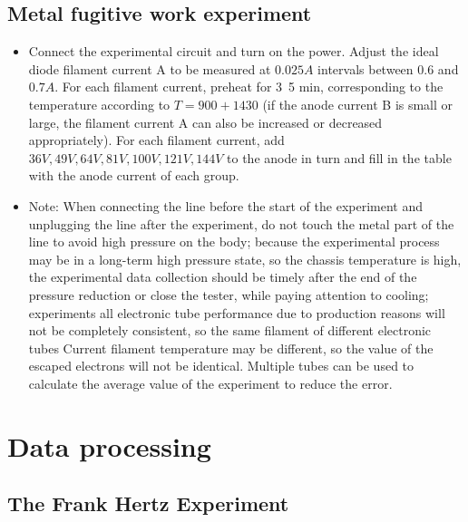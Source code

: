 \documentclass[UTF8]{article}
\begin{document}
    \subsection{Metal fugitive work experiment}
    \begin{itemize}
    \item Connect the experimental circuit and turn on the power. Adjust the ideal diode filament current A to be measured at $0.025A$ intervals between $0.6$ and $0.7A$. For each filament current, preheat for 3~5 min, corresponding to the temperature according to $T = 900+1430$ (if the anode current B is small or large, the filament current A can also be increased or decreased appropriately). For each filament current, add $36V,49V,64V,81V,100V,121V,144V$ to the anode in turn and fill in the table with the anode current of each group. 
    \item Note: When connecting the line before the start of the experiment and unplugging the line after the experiment, do not touch the metal part of the line to avoid high pressure on the body; because the experimental process may be in a long-term high pressure state, so the chassis temperature is high, the experimental data collection should be timely after the end of the pressure reduction or close the tester, while paying attention to cooling; experiments all electronic tube performance due to production reasons will not be completely consistent, so the same filament of different electronic tubes Current filament temperature may be different, so the value of the escaped electrons will not be identical. Multiple tubes can be used to calculate the average value of the experiment to reduce the error.
    \end{itemize}
    
    
	
	\section{Data processing}
	\subsection{The Frank Hertz Experiment}
\end{document}
